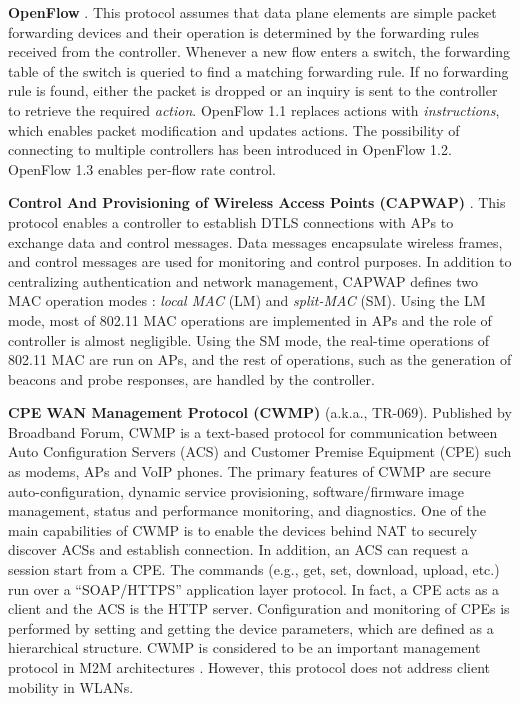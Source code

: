 \textbf{OpenFlow }\cite{OpenFlow}. This protocol assumes that data plane elements are simple packet forwarding devices and their operation is determined by the forwarding rules received from the controller.
Whenever a new flow enters a switch, the forwarding table of the switch is queried to find a matching forwarding rule.
If no forwarding rule is found, either the packet is dropped or an inquiry is sent to the controller to retrieve the required \textit{action}.
OpenFlow 1.1 replaces actions with \textit{instructions}, which enables packet modification and updates actions.
The possibility of connecting to multiple controllers has been introduced in OpenFlow 1.2. 
OpenFlow 1.3 enables per-flow rate control. %


\textbf{Control And Provisioning of Wireless Access Points (CAPWAP) }\cite{CAPWAP}. This protocol enables a controller to establish DTLS \cite{DTLS} connections with APs to exchange data and control messages.
Data messages encapsulate wireless frames, and control messages are used for monitoring and control purposes.
In addition to centralizing authentication and network management, CAPWAP defines two MAC operation modes \cite{shao2015ieee}: \textit{local MAC} (LM) and \textit{split-MAC} (SM). 
Using the LM mode, most of 802.11 MAC operations are implemented in APs and the role of controller is almost negligible. 
Using the SM mode, the real-time operations of 802.11 MAC are run on APs, and the rest of operations, such as the generation of beacons and probe responses, are handled by the controller.


\textbf{CPE WAN Management Protocol (CWMP)} \cite{TR069} (a.k.a., TR-069). Published by Broadband Forum, CWMP is a text-based protocol for communication between Auto Configuration Servers (ACS) and Customer Premise Equipment (CPE) such as modems, APs and VoIP phones.
The primary features of CWMP are secure auto-configuration, dynamic service provisioning, software/firmware image management, status and performance monitoring, and diagnostics.
One of the main capabilities of CWMP is to enable the devices behind NAT to securely discover ACSs and establish connection.
In addition, an ACS can request a session start from a CPE.
The commands (e.g., get, set, download, upload, etc.) run over a “SOAP/HTTPS” application layer protocol.
In fact, a CPE acts as a client and the ACS is the HTTP server.
Configuration and monitoring of CPEs is performed by setting and getting the device parameters, which are defined as a hierarchical structure.
CWMP is considered to be an important management protocol in M2M architectures \cite{swetina2014toward,al2015toward}.
However, this protocol does not address client mobility in WLANs.


